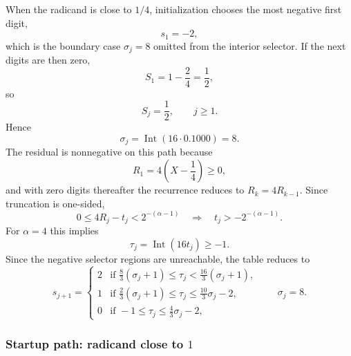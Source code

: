 \documentclass[11pt]{article}
\DeclareMathOperator{\Int}{Int}
\numberwithin{equation}{section}
\begin{document}
When the radicand is close to $1/4$, initialization chooses the most negative first digit,
\[
  s_1 = -2,
\]
which is the boundary case $\sigma_j=8$ omitted from the interior selector.
If the next digits are then zero, 
\begin{equation}
  \label{eq:sqrt:radix4_near_quarter_s1}
  S_1 = 1 - \frac{2}{4} = \frac{1}{2},
\end{equation}
so
\begin{equation}
  \label{eq:sqrt:radix4_near_quarter_sj}
  S_j = \frac{1}{2}, \qquad j\ge 1.
\end{equation}
Hence
\begin{equation}
  \label{eq:sqrt:radix4_near_quarter_sigma}
  \sigma_j = \Int(16\cdot 0.1000) = 8.
\end{equation}
The residual is nonnegative on this path because
\begin{equation}
  \label{eq:sqrt:radix4_near_quarter_r1}
  R_1 = 4\left(X-\frac{1}{4}\right) \ge 0,
\end{equation}
and with zero digits thereafter the recurrence reduces to $R_k = 4R_{k-1}$.
Since truncation is one-sided,
\[
  0 \le 4R_j - t_j < 2^{-(\alpha-1)}
  \quad \Longrightarrow \quad
  t_j > -2^{-(\alpha-1)}.
\]
For $\alpha=4$ this implies
\begin{equation}
  \label{eq:sqrt:radix4_near_quarter_tau}
  \tau_j = \Int(16t_j) \ge -1.
\end{equation}
Since the negative selector regions are unreachable, the table reduces to
\begin{equation}
  \label{eq:sqrt:radix4_logic_near_quarter}
  s_{j+1} =
  \begin{cases}
    2 & \text{if } \frac{8}{3}(\sigma_j+1) \le \tau_j < \frac{16}{3}(\sigma_j+1), \\
    1 & \text{if } \frac{2}{3}(\sigma_j+1) \le \tau_j \le \frac{10}{3}\sigma_j - 2, \\
    0 & \text{if } -1 \le \tau_j \le \frac{4}{3}\sigma_j - 2,
  \end{cases}
  \qquad \sigma_j = 8.
\end{equation}

\subsubsection{Startup path: radicand close to \texorpdfstring{$1$}{1}}
\label{sssec:sqrt:radix4_near_one}
\end{document}
